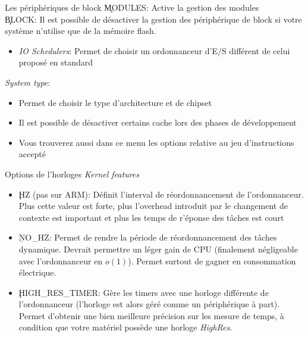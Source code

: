 \begin{frame}[fragile=singleslide]{Les périphériques de block}
  \c{MODULES}: Active la gestion des modules
  \\[2ex]
  \c{BLOCK}: Il est possible  de désactiver la gestion des périphérique
  de block si votre système n'utilise que de la mémoire flash.
  \begin{itemize} 
  \item \emph{IO  Schedulers}: Permet de choisir  un ordonnanceur d'E/S
    différent de celui proposé en standard
  \end{itemize} 
  \emph{System type}:
  \begin{itemize} 
  \item Permet de choisir le type d'architecture et de chipset
  \item Il est  possible de désactiver certains cache  lors des phases
    de développement
  \item Vous trouverez  aussi dans ce menu les  options relative au jeu
    d'instructions accepté
  \end{itemize}
\end{frame}

\begin{frame}[fragile=singleslide]{Options de l'horloges}
  \emph{Kernel features}
  \begin{itemize} 
  \item \c{HZ} (pas sur  ARM): Définit l'interval de réordonnancement
    de l'ordonnanceur.  Plus cette valeur est forte, plus l'overhead
    introduit par  le changement de  contexte est important  et plus
    les temps de r'éponse des tâches est court
  \item \c{NO_HZ}:  Permet de  rendre la période  de réordonnancement
    des  tâches dynamique. Devrait  permettre un  léger gain  de CPU
    (finalement négligeable  avec l'ordonnanceur en  $o(1)$). Permet
    surtout de gagner en consommation électrique.
  \item   \c{HIGH_RES_TIMER}:  Gère  les   timers  avec   une  horloge
    différente de l'ordonnanceur (l'horloge  est alors géré comme un
    périphérique  à  part).  Permet  d'obtenir  une  bien  meilleure
    précision  sur  les  mesure  de  temps, à  condition  que  votre
    matériel possède une horloge \emph{HighRes}.
  \end{itemize}
\end{frame}  

